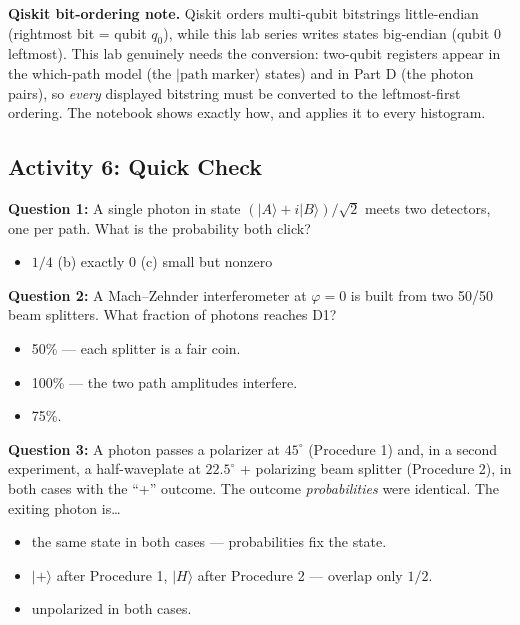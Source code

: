\documentclass[a4paper,11pt]{article}
\providecommand{\ket}[1]{|#1\rangle}
\begin{document}
\begin{warningbox}
\textbf{Qiskit bit-ordering note.} Qiskit orders multi-qubit bitstrings
little-endian (rightmost bit = qubit $q_0$), while this lab series writes states
big-endian (qubit 0 leftmost). This lab genuinely needs the
conversion: two-qubit registers appear in the
which-path model (the $\ket{\text{path}\;\text{marker}}$ states) and in Part D (the
photon pairs), so \emph{every} displayed bitstring must be converted to the
leftmost-first ordering. The notebook shows exactly how, and applies it to every
histogram.
\end{warningbox}

\subsection{Activity 6: Quick Check}

\begin{reflectionbox}
\textbf{Question 1:} A single photon in state $(\ket{A} + i\ket{B})/\sqrt 2$ meets
two detectors, one per path. What is the probability both click?
\begin{itemize}
    \item[(a)] $1/4$ \qquad (b) exactly $0$ \qquad (c) small but nonzero
\end{itemize}

\textbf{Question 2:} A Mach--Zehnder interferometer at $\varphi = 0$ is built from
two 50/50 beam splitters. What fraction of photons reaches D1?
\begin{itemize}
    \item[(a)] 50\% --- each splitter is a fair coin.
    \item[(b)] 100\% --- the two path amplitudes interfere.
    \item[(c)] 75\%.
\end{itemize}

\textbf{Question 3:} A photon passes a polarizer at $45^\circ$ (Procedure 1) and, in
a second experiment, a half-waveplate at $22.5^\circ$ + polarizing beam splitter
(Procedure 2), in both cases with the ``+'' outcome. The outcome
\emph{probabilities} were identical. The exiting photon is\dots
\begin{itemize}
    \item[(a)] the same state in both cases --- probabilities fix the state.
    \item[(b)] $\ket{+}$ after Procedure 1, $\ket{H}$ after Procedure 2 --- overlap
               only $1/2$.
    \item[(c)] unpolarized in both cases.
\end{itemize}
\end{reflectionbox}
\end{document}
